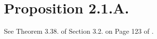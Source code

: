 \section{Proposition 2.1.A.}

See Theorem 3.38. of Section 3.2. on Page 123 of \cite{rotman2009introduction}.